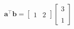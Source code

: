 \documentclass[preview]{standalone}
\begin{document}
\begin{align*}
\mathbf{a}^\top \mathbf{b} = \begin{bmatrix} 1 & 2 \end{bmatrix}\begin{bmatrix} 3 \\ \\ 1 \end{bmatrix}
\end{align*}
\end{document}
